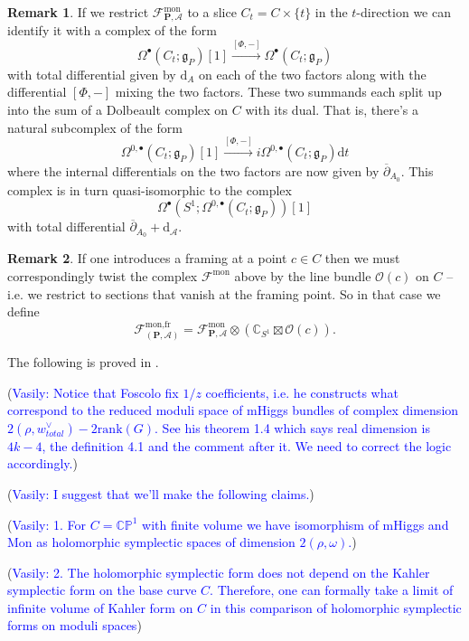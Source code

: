 \documentclass[11pt, oneside, reqno]{amsart}
\theoremstyle{definition} \newtheorem{definition}{Definition}[section]
\theoremstyle{definition} \newtheorem{remark}[definition]{Remark}
\theoremstyle{definition} \newtheorem{remarks}[definition]{Remarks}
\theoremstyle{definition} \newtheorem{question}[definition]{Question}
\theoremstyle{definition} \newtheorem*{note}{Note}
\theoremstyle{definition} \newtheorem{example}[definition]{Example}
\theoremstyle{definition} \newtheorem{examples}[definition]{Examples}
\renewcommand{\gg}{\mathfrak{g}}
\newcommand{\mr}[1]{\mathrm{#1}}
\newcommand{\mc}[1]{\mathcal{#1}}
\newcommand{\bo}[1]{\boldsymbol{#1}}
\newcommand{\dd}{\partial}
\newcommand{\ol}[1]{\overline{#1}}
\newcommand{\CC}{\mathbb{C}}
\newcommand{\OO}{\mathcal{O}}
\renewcommand{\d}{\mathrm{d}}
\newcommand{\vasily}[1]{(\textcolor{blue}{Vasily: #1})}
\begin{document}
\begin{remark} \label{monopole_holo_restriction_rmk}
If we restrict $\mc F^{\mr{mon}}_{\bo P, \mc A}$ to a slice $C_t = C \times \{t\}$ in the $t$-direction we can identify it with a complex of the form
\[\Omega^\bullet(C_t; \gg_P)[1] \overset {[\Phi,-]} \to \Omega^\bullet(C_t; \gg_P)\]
with total differential given by $\d_A$ on each of the two factors along with the differential $[\Phi,-]$ mixing the two factors.  These two summands each split up into the sum of a Dolbeault complex on $C$ with its dual.  That is, there's a natural subcomplex of the form
\[\Omega^{0,\bullet}(C_t; \gg_P)[1] \overset {[\Phi,-]} \to i \Omega^{0,\bullet}(C_t; \gg_P) \d t\]
where the internal differentials on the two factors are now given by $\ol \dd_{A_0}$.  This complex is in turn quasi-isomorphic to the complex
\[\Omega^\bullet(S^1; \Omega^{0,\bullet}(C_t;\gg_P))[1]\]
with total differential $\ol \dd_{A_0} + \d_{\mc A}$.
\end{remark}

\begin{remark}
If one introduces a framing at a point $c \in C$ then we must correspondingly twist the complex $\mc F^{\mr{mon}}$ above by the line bundle $\OO(c)$ on $C$ -- i.e. we restrict to sections that vanish at the framing point.  So in that case we define
\[\mc F^{\text{mon,fr}}_{(\bo P,\mc A)} = \mc F^{\mr{mon}}_{\bo P, \mc A} \otimes (\CC_{S^1} \boxtimes \OO(c)).\]
\end{remark}

The following is proved in \cite{FoscoloDef}.

\vasily{Notice that Foscolo fix $1/z$ coefficients, i.e.  he constructs
what correspond to the reduced moduli space of mHiggs bundles of complex dimension $2(\rho, w_{total}^{\vee}) - 2 \mathrm{rank}(G)$. See his theorem 1.4 which says real dimension is $4 k - 4$,
the definition 4.1 and the comment after it. We need to correct the logic
accordingly.}

\vasily{I suggest that we'll make the following claims.}

\vasily{
  1. For $C = \mathbb{CP}^{1}$ with finite volume we have isomorphism
  of mHiggs and Mon as holomorphic symplectic spaces of dimension $2 (\rho ,\omega)$.}

\vasily{
  2. The holomorphic symplectic form does not depend on the Kahler
  symplectic form on the base curve $C$. Therefore, one can formally take
  a limit of infinite volume of Kahler form on $C$ in this comparison of holomorphic symplectic forms on moduli spaces}
\end{document}
